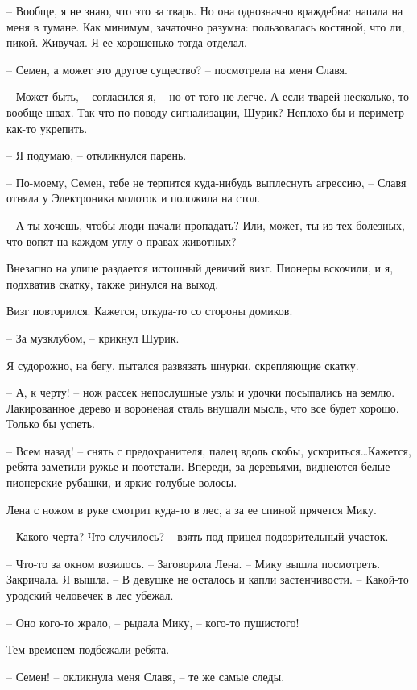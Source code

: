 \documentclass[a4paper]{book}
\begin{document}
-- Вообще, я не знаю, что это за тварь. Но она однозначно враждебна: напала на меня в тумане. Как минимум, зачаточно разумна: пользовалась костяной, что ли, пикой. Живучая. Я ее хорошенько тогда отделал.

-- Семен, а может это другое существо? -- посмотрела на меня Славя.

-- Может быть, -- согласился я, -- но от того не легче. А если тварей несколько, то вообще швах. Так что по поводу сигнализации, Шурик? Неплохо бы и периметр как-то укрепить.

-- Я подумаю, -- откликнулся парень.

-- По-моему, Семен, тебе не терпится куда-нибудь выплеснуть агрессию, -- Славя отняла у Электроника молоток и положила на стол. 

-- А ты хочешь, чтобы люди начали пропадать?  Или, может, ты из тех болезных, что вопят на каждом углу о правах животных?

Внезапно на улице раздается истошный девичий визг. Пионеры вскочили, и я, подхватив скатку, также ринулся на выход. 

Визг повторился. Кажется, откуда-то со стороны домиков. 

-- За музклубом, -- крикнул Шурик.

Я судорожно, на бегу, пытался развязать шнурки, скрепляющие скатку. 

-- А, к черту! -- нож рассек непослушные узлы и удочки посыпались на землю. Лакированное дерево и вороненая сталь внушали мысль, что все будет хорошо. Только бы успеть.

-- Всем назад! -- снять с предохранителя, палец вдоль скобы, ускориться\ldots Кажется, ребята заметили ружье и поотстали. Впереди, за деревьями, виднеются белые пионерские рубашки, и яркие голубые волосы. 

Лена с ножом в руке смотрит куда-то в лес, а за ее спиной прячется Мику.

-- Какого черта? Что случилось? -- взять под прицел подозрительный участок. 

-- Что-то за окном возилось. -- Заговорила Лена. -- Мику вышла посмотреть. Закричала. Я вышла. -- В девушке не осталось и капли застенчивости. -- Какой-то уродский человечек в лес убежал.

-- Оно кого-то жрало, -- рыдала Мику, -- кого-то пушистого!

Тем временем подбежали ребята. 

-- Семен! -- окликнула меня Славя, -- те же самые следы. 
\end{document}
